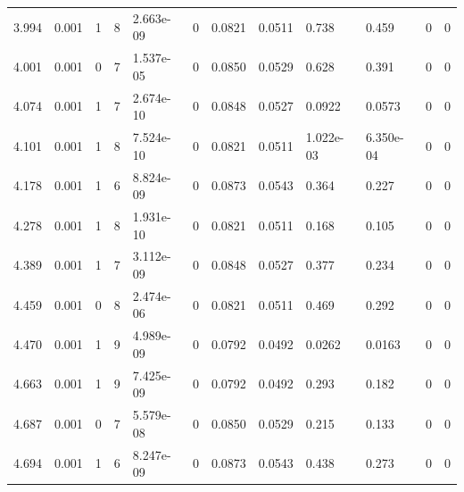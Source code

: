 \documentclass[preview]{standalone}
\begin{document}
{{{\begin{tabular}{L{1.2cm}C{1.2cm} C{0.3cm}C{0.5cm} C{1.4cm}C{1.4cm} C{1.4cm}C{1.4cm} C{1.6cm}C{1.6cm} C{1.6cm}C{1.6cm}}
  3.994  &  0.001  & 1     &  8 &  2.663e-09  & 0  &  0.0821&   0.0511& 0.738 & 0.459   &  0 & 0  \\ 
  4.001  &  0.001  & 0     &  7 &  1.537e-05  & 0  &  0.0850&   0.0529& 0.628 & 0.391   &  0 & 0  \\ 
  4.074  &  0.001  & 1     &  7 &  2.674e-10  & 0  &  0.0848&   0.0527& 0.0922 & 0.0573   &  0 & 0  \\ 
  4.101  &  0.001  & 1     &  8 &  7.524e-10  & 0  &  0.0821&   0.0511& 1.022e-03 & 6.350e-04   &  0 & 0  \\ 
  4.178  &  0.001  & 1     &  6 &  8.824e-09  & 0  &  0.0873&   0.0543& 0.364 & 0.227   &  0 & 0  \\ 
  4.278  &  0.001  & 1     &  8 &  1.931e-10  & 0  &  0.0821&   0.0511& 0.168 & 0.105   &  0 & 0  \\ 
  4.389  &  0.001  & 1     &  7 &  3.112e-09  & 0  &  0.0848&   0.0527& 0.377 & 0.234   &  0 & 0  \\ 
  4.459  &  0.001  & 0     &  8 &  2.474e-06  & 0  &  0.0821&   0.0511& 0.469 & 0.292   &  0 & 0  \\ 
  4.470  &  0.001  & 1     &  9 &  4.989e-09  & 0  &  0.0792&   0.0492& 0.0262 & 0.0163   &  0 & 0  \\ 
  4.663  &  0.001  & 1     &  9 &  7.425e-09  & 0  &  0.0792&   0.0492& 0.293 & 0.182   &  0 & 0  \\ 
  4.687  &  0.001  & 0     &  7 &  5.579e-08  & 0  &  0.0850&   0.0529& 0.215 & 0.133   &  0 & 0  \\ 
  4.694  &  0.001  & 1     &  6 &  8.247e-09  & 0  &  0.0873&   0.0543& 0.438 & 0.273   &  0 & 0  \\ 
\hline 
\end{tabular} 

}}}
\end{document}
